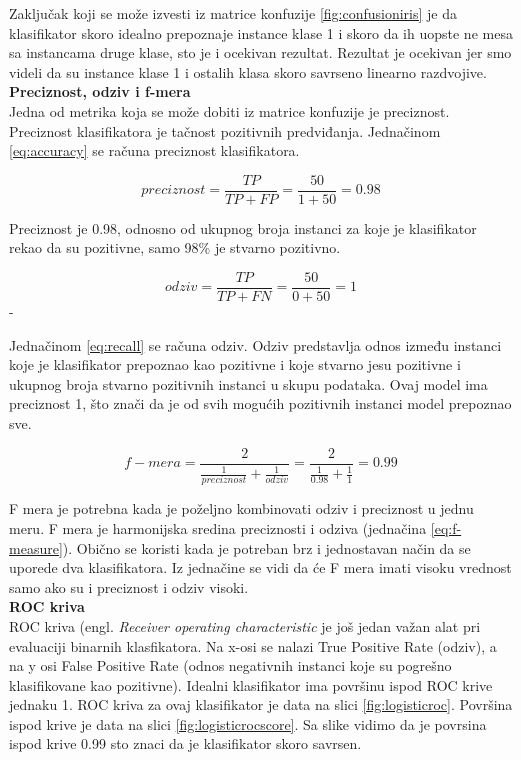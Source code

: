 \documentclass[a4paper,12pt]{report}
\begin{document}
Zaključak koji se može izvesti iz matrice konfuzije \ref{fig:confusioniris} je da klasifikator skoro idealno prepoznaje instance klase 1 i skoro da ih uopste ne mesa sa instancama druge klase, sto je i ocekivan rezultat. Rezultat je ocekivan jer smo videli da su instance klase 1 i ostalih klasa skoro savrseno linearno razdvojive.\\

\textbf{Preciznost, odziv i f-mera}\\

Jedna od metrika koja se može dobiti iz matrice konfuzije je preciznost. Preciznost klasifikatora je tačnost pozitivnih predviđanja. Jednačinom \ref{eq:accuracy} se računa preciznost klasifikatora. 

\begin{equation} \label{eq:accuracy}
	preciznost = \frac{TP}{TP + FP} = \frac{50}{1 + 50} = 0.98
\end{equation}

Preciznost je 0.98, odnosno od ukupnog broja instanci za koje je klasifikator rekao da su pozitivne, samo 98\% je stvarno pozitivno. 

\begin{equation} \label{eq:recall}
	odziv = \frac{TP}{TP + FN} = \frac{50}{0 + 50} = 1
\end{equation}-

Jednačinom \ref{eq:recall} se računa odziv. Odziv predstavlja odnos između instanci koje je klasifikator prepoznao kao pozitivne i koje stvarno jesu pozitivne i ukupnog broja stvarno pozitivnih instanci u skupu podataka. Ovaj model ima preciznost 1, što znači da je od svih mogućih pozitivnih instanci model prepoznao sve.

\begin{equation} \label{eq:f-measure}
	f-mera = \frac{2}{\frac{1}{preciznost} + \frac{1}{odziv}} =  \frac{2}{\frac{1}{0.98} + \frac{1}{1}} = 0.99
\end{equation}

F mera je potrebna kada je poželjno kombinovati odziv i preciznost u jednu meru. F mera je harmonijska sredina preciznosti i odziva (jednačina \ref{eq:f-measure}). Obično se koristi kada je potreban brz i jednostavan način da se uporede dva klasifikatora. Iz jednačine se vidi da će F mera imati visoku vrednost samo ako su i preciznost i odziv visoki. \\

\textbf{ROC kriva}\\

ROC kriva (engl. \textit{Receiver operating characteristic} je još jedan važan alat pri evaluaciji binarnih klasfikatora. Na x-osi se nalazi True Positive Rate (odziv), a na y osi False Positive Rate (odnos negativnih instanci koje su pogrešno klasifikovane kao pozitivne). Idealni klasifikator ima površinu ispod ROC krive jednaku 1. ROC kriva za ovaj klasifikator je data na slici \ref{fig:logisticroc}. Površina ispod krive je data na slici \ref{fig:logisticrocscore}. Sa slike vidimo da je povrsina ispod krive 0.99 sto znaci da je klasifikator skoro savrsen.\\
\end{document}

